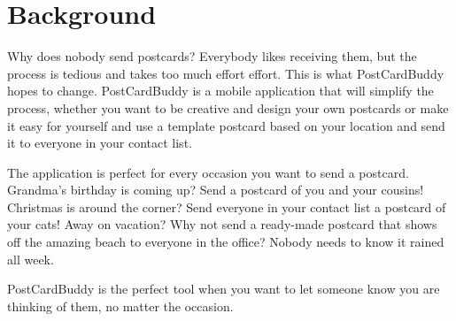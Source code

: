 \documentclass[10pt,a4paper]{article}
\begin{document}
\section{Background}
Why does nobody send postcards? Everybody likes receiving them, but the process is tedious and takes too much effort effort. This is what PostCardBuddy hopes to change. PostCardBuddy is a mobile application that will simplify the process, whether you want to be creative and design your own postcards or make it easy for yourself and use a template postcard based on your location and send it to everyone in your contact list. 

The application is perfect for every occasion you want to send a postcard. Grandma's birthday is coming up? Send a postcard of you and your cousins! Christmas is around the corner? Send everyone in your contact list a postcard of your cats! Away on vacation? Why not send a ready-made postcard that shows off the amazing beach to everyone in the office? Nobody needs to know it rained all week. 

PostCardBuddy is the perfect tool when you want to let someone know you are thinking of them, no matter the occasion.


\end{document}
